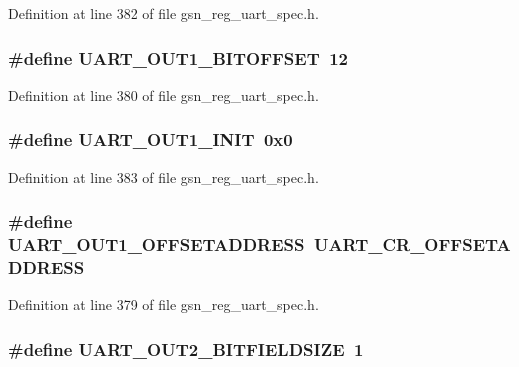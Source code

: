 Definition at line 382 of file gsn\_\-reg\_\-uart\_\-spec.h.

\hypertarget{a00575_a6a173b4c1214a9c48cfc4fec04f3494c}{
\subsubsection[{UART\_\-OUT1\_\-BITOFFSET}]{\setlength{\rightskip}{0pt plus 5cm}\#define UART\_\-OUT1\_\-BITOFFSET~12}}
\label{a00575_a6a173b4c1214a9c48cfc4fec04f3494c}


Definition at line 380 of file gsn\_\-reg\_\-uart\_\-spec.h.

\hypertarget{a00575_a07387c22ca4fbbd160050c35a6df2bea}{
\subsubsection[{UART\_\-OUT1\_\-INIT}]{\setlength{\rightskip}{0pt plus 5cm}\#define UART\_\-OUT1\_\-INIT~0x0}}
\label{a00575_a07387c22ca4fbbd160050c35a6df2bea}


Definition at line 383 of file gsn\_\-reg\_\-uart\_\-spec.h.

\hypertarget{a00575_ab19dd309470c66272aa64fd1b0da19af}{
\subsubsection[{UART\_\-OUT1\_\-OFFSETADDRESS}]{\setlength{\rightskip}{0pt plus 5cm}\#define UART\_\-OUT1\_\-OFFSETADDRESS~UART\_\-CR\_\-OFFSETADDRESS}}
\label{a00575_ab19dd309470c66272aa64fd1b0da19af}


Definition at line 379 of file gsn\_\-reg\_\-uart\_\-spec.h.

\hypertarget{a00575_a40a7cd7b95212a83a818dd8597952e58}{
\subsubsection[{UART\_\-OUT2\_\-BITFIELDSIZE}]{\setlength{\rightskip}{0pt plus 5cm}\#define UART\_\-OUT2\_\-BITFIELDSIZE~1}}
\label{a00575_a40a7cd7b95212a83a818dd8597952e58}


